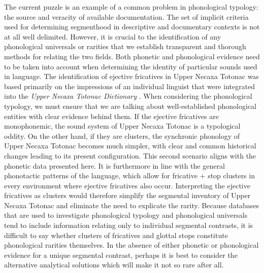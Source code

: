 \documentclass[output=paper,colorlinks,citecolor=brown]{langscibook}
\begin{document}
The current puzzle is an example of a common problem in phonological typology: the source and veracity of available documentation. The set of implicit criteria used for determining segmenthood in descriptive and documentary contexts is not at all well delimited. However, it is crucial to the identification of any phonological universals or rarities that we establish transparent and thorough methods for relating the two fields. Both phonetic and phonological evidence need to be taken into account when determining the identity of particular sounds used in language. The identification of ejective fricatives in Upper Necaxa Totonac was based primarily on the impressions of an individual linguist that were integrated into the \textit{Upper Necaxa Totonac Dictionary} \citep{Beck2011}. When considering the phonological typology, we must ensure that we are talking about well-established phonological entities with clear evidence behind them. If the ejective fricatives are monophonemic, the sound system of Upper Necaxa Totonac is a typological oddity. On the other hand, if they are clusters, the synchronic phonology of Upper Necaxa Totonac becomes much simpler, with clear and common historical changes leading to its present configuration. This second scenario aligns with the phonetic data presented here. It is furthermore in line with the general phonotactic patterns of the language, which allow for fricative + stop clusters in every environment where ejective fricatives also occur. Interpreting the ejective fricatives as clusters would therefore simplify the segmental inventory of Upper Necaxa Totonac and eliminate the need to explicate the rarity. Because databases that are used to investigate phonological typology and phonological universals tend to include information relating only to individual segmental contrasts, it is difficult to say whether clusters of fricatives and glottal stops constitute phonological rarities themselves. In the absence of either phonetic or phonological evidence for a unique segmental contrast, perhaps it is best to consider the alternative analytical solutions which will make it not so rare after all.

\end{document}

